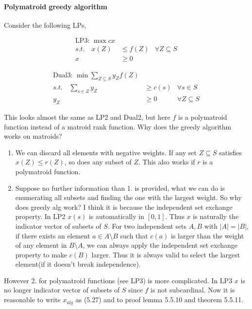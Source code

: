 \paragraph{Polymatroid greedy algorithm} Consider the following LPs,

\begin{minipage}{.45\textwidth}
\begin{align*}
    \text{LP3: } \max  cx\\
    s.t. \quad x(Z)&\leq f(Z) &\forall Z \subseteq S\\
                x&\geq 0
\end{align*}
\end{minipage}
\begin{minipage}{.45\textwidth}
    \begin{align*}
        \text{Dual3: } \min \sum_{Z\subseteq S} y_Z f(Z)\\
        s.t. \quad \sum_{s\in Z}y_Z&\geq c(s) & \forall s\in S\\
        y_Z&\geq 0 & \forall Z\subseteq S
    \end{align*}
\end{minipage}

This looks almost the same as LP2 and Dual2, but here $f$ is a polymatroid function instead of a matroid rank function. Why does the greedy algorithm works on matroids?

\begin{enumerate}
    \item We can discard all elements with negative weights. If any set $Z\subseteq S$ satisfies $x(Z)\leq r(Z)$, so does any subset of $Z$. This also works if $r$ is a polymatroid function.
    \item Suppose no further information than 1. is provided, what we can do is enumerating all subsets and finding the one with the largest weight. So why does greedy alg work? I think it is because the independent set exchange property. In LP2 $x(s)$ is automatically in $[0,1]$. Thus $x$ is naturally the indicator vector of subsets of $S$. For two independent sets $A,B$ with $|A|=|B|$, if there exists an element $a\in A\setminus B$ such that $c(a)$ is larger than the weight of any element in $B\setminus A$, we can always apply the independent set exchange property to make $c(B)$ larger. Thus it is always valid to select the largest element(if it doesn't break independence).
\end{enumerate}

However 2. for polymatroid functions (see LP3) is more complicated. In LP3 $x$ is no longer indicator vector of subsets of $S$ since $f$ is not subcardinal. Now it is reasonable to write $x_{alg}$ as (5.27) and to proof lemma 5.5.10 and theorem 5.5.11.

